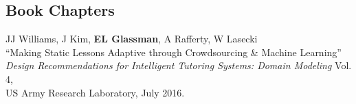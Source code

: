 \documentclass[10pt, a4paper]{article}
\newcommand{\years}[1]{\marginnote{\normalsize #1}}
\begin{document}
\subsection*{Book Chapters}
\noindent
\years{2016}
JJ Williams, J Kim, \textbf{EL Glassman}, A Rafferty, W Lasecki\\
``Making Static Lessons Adaptive through Crowdsourcing \& Machine Learning''\\ 
\emph{Design Recommendations for Intelligent Tutoring Systems: Domain Modeling} Vol. 4, \\
US Army Research Laboratory, July 2016.

\end{document}
